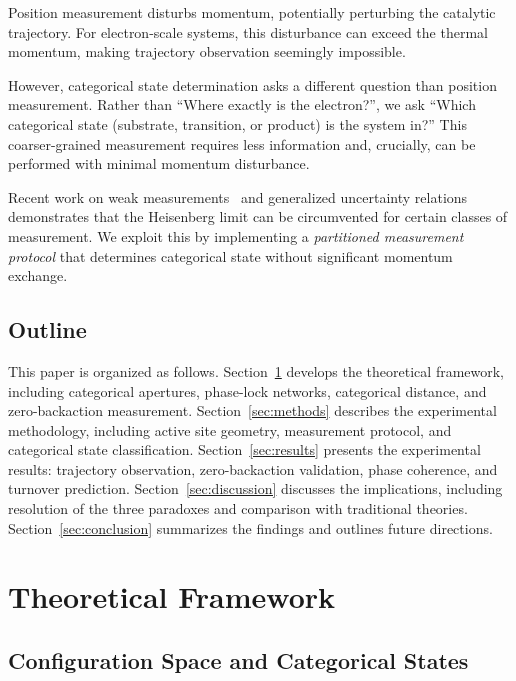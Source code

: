 \documentclass[twocolumn,amsmath,amssymb,aps,prb,superscriptaddress,longbibliography]{revtex4-2}
\begin{document}
Position measurement disturbs momentum, potentially perturbing the catalytic trajectory. For electron-scale systems, this disturbance can exceed the thermal momentum, making trajectory observation seemingly impossible.

However, categorical state determination asks a different question than position measurement. Rather than ``Where exactly is the electron?'', we ask ``Which categorical state (substrate, transition, or product) is the system in?'' This coarser-grained measurement requires less information and, crucially, can be performed with minimal momentum disturbance.

Recent work on weak measurements~\cite{Aharonov1988, Dressel2014} and generalized uncertainty relations~\cite{Ozawa2003, Rozema2012, Erhart2012} demonstrates that the Heisenberg limit can be circumvented for certain classes of measurement. We exploit this by implementing a \emph{partitioned measurement protocol} that determines categorical state without significant momentum exchange.

\subsection{Outline}

This paper is organized as follows. Section~\ref{sec:theory} develops the theoretical framework, including categorical apertures, phase-lock networks, categorical distance, and zero-backaction measurement. Section~\ref{sec:methods} describes the experimental methodology, including active site geometry, measurement protocol, and categorical state classification. Section~\ref{sec:results} presents the experimental results: trajectory observation, zero-backaction validation, phase coherence, and turnover prediction. Section~\ref{sec:discussion} discusses the implications, including resolution of the three paradoxes and comparison with traditional theories. Section~\ref{sec:conclusion} summarizes the findings and outlines future directions.

\section{Theoretical Framework}
\label{sec:theory}

\subsection{Configuration Space and Categorical States}
\end{document}
